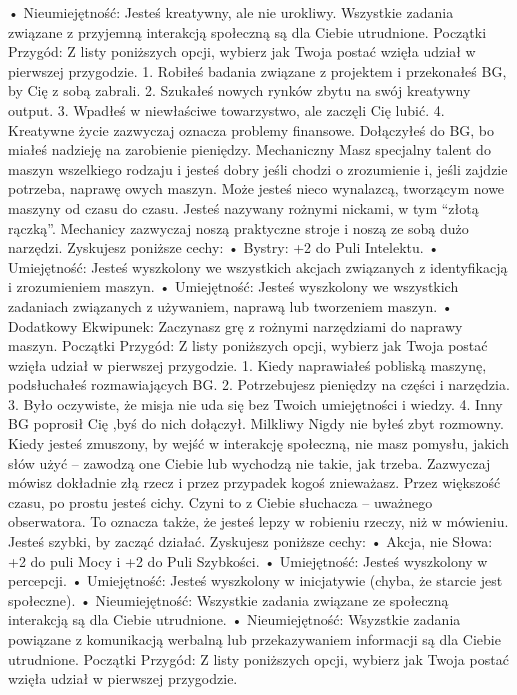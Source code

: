     • Nieumiejętność: Jesteś kreatywny, ale nie urokliwy. Wszystkie zadania związane z przyjemną interakcją społeczną są dla Ciebie utrudnione.
Początki Przygód: Z listy poniższych opcji, wybierz jak Twoja postać wzięła udział w pierwszej przygodzie.
1. Robiłeś badania związane z projektem i przekonałeś BG, by Cię z sobą zabrali.
2. Szukałeś nowych rynków zbytu na swój kreatywny output.
3. Wpadłeś w niewłaściwe towarzystwo, ale zaczęli Cię lubić.
4. Kreatywne życie zazwyczaj oznacza problemy finansowe. Dołączyłeś do BG, bo miałeś nadzieję na zarobienie pieniędzy.
Mechaniczny
Masz specjalny talent do maszyn wszelkiego rodzaju i jesteś dobry jeśli chodzi o zrozumienie i, jeśli zajdzie potrzeba, naprawę owych maszyn. Może jesteś nieco wynalazcą, tworzącym nowe maszyny od czasu do czasu. Jesteś nazywany rożnymi nickami, w tym “złotą rączką”. Mechanicy zazwyczaj noszą praktyczne stroje i noszą ze sobą dużo narzędzi.
Zyskujesz poniższe cechy:
    • Bystry: +2 do Puli Intelektu.
    • Umiejętność: Jesteś wyszkolony we wszystkich akcjach związanych z identyfikacją i zrozumieniem maszyn.
    • Umiejętność: Jesteś wyszkolony we wszystkich zadaniach związanych z używaniem, naprawą lub tworzeniem maszyn.
    • Dodatkowy Ekwipunek: Zaczynasz grę z rożnymi narzędziami do naprawy maszyn.
Początki Przygód: Z listy poniższych opcji, wybierz jak Twoja postać wzięła udział w pierwszej przygodzie.
1. Kiedy naprawiałeś pobliską maszynę, podsłuchałeś rozmawiających BG.
2. Potrzebujesz pieniędzy na części i narzędzia.
3. Było oczywiste, że misja nie uda się bez Twoich umiejętności i wiedzy.
4. Inny BG poprosił Cię ,byś do nich dołączył.
Milkliwy 
Nigdy nie byłeś zbyt rozmowny. Kiedy jesteś zmuszony, by wejść w interakcję społeczną, nie masz pomysłu, jakich słów użyć – zawodzą one Ciebie lub wychodzą nie takie, jak trzeba. Zazwyczaj mówisz dokładnie złą rzecz i przez przypadek kogoś znieważasz. Przez większość czasu, po prostu jesteś cichy. Czyni to z Ciebie słuchacza – uważnego obserwatora. To oznacza także, że jesteś lepzy w robieniu rzeczy, niż w mówieniu. Jesteś szybki, by zacząć działać.
Zyskujesz poniższe cechy:
    • Akcja, nie Słowa: +2 do puli Mocy i +2 do Puli Szybkości.
    • Umiejętność: Jesteś wyszkolony w percepcji.
    • Umiejętność: Jesteś wyszkolony w inicjatywie (chyba, że starcie jest społeczne).
    • Nieumiejętność: Wszystkie zadania związane ze społeczną interakcją są dla Ciebie utrudnione.
    • Nieumiejętność: Wsyzstkie zadania powiązane z komunikacją werbalną lub przekazywaniem informacji są dla Ciebie utrudnione.
Początki Przygód: Z listy poniższych opcji, wybierz jak Twoja postać wzięła udział w pierwszej przygodzie.
